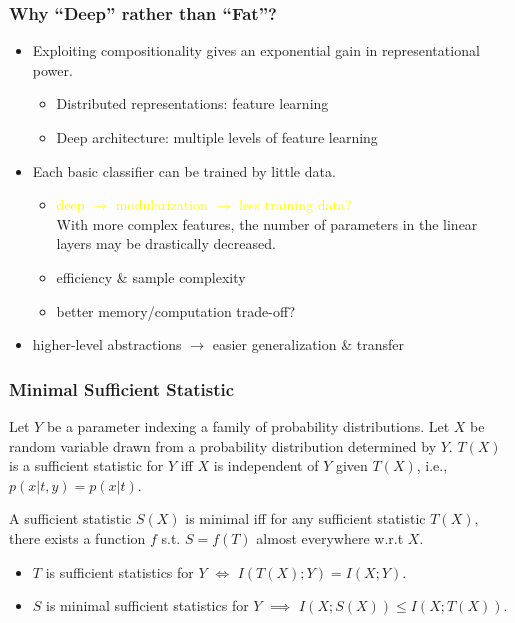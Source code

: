 \documentclass[UTF8,11pt,colorlinks,compress,openany]{beamer}%
\begin{document}
\begin{frame}\frametitle{Why ``Deep'' rather than ``Fat''?}	
	\begin{itemize}
		\item Exploiting compositionality gives an exponential gain in representational power.
		\begin{itemize}
			\item Distributed representations: feature learning
			\item Deep architecture: multiple levels of feature learning
		\end{itemize}
		\item Each basic classifier can be trained by little data.
		\begin{itemize}
			\item \textcolor{yellow}{deep $\to$ modularization $\to$ less training data?}\\
			With more complex features, the number of parameters in the linear layers may be drastically decreased.
			\item efficiency \& sample complexity
			\item better memory/computation trade-off?
		\end{itemize}
		\item higher-level abstractions $\to$ easier generalization \& transfer
	\end{itemize}
\end{frame}

\begin{frame}\frametitle{Minimal Sufficient Statistic}
\begin{definition}
Let $Y$ be a parameter indexing a family of probability distributions. Let $X$ be random variable drawn from a probability distribution determined by $Y$. $T(X)$ is a sufficient statistic for $Y$ iff $X$ is independent of $Y$ given $T(X)$, i.e., $p(x|t,y)=p(x|t)$.
\end{definition}
\begin{definition}
A sufficient statistic $S(X)$ is minimal iff for any sufficient statistic $T(X)$, there exists a function $f$ s.t. $S=f(T)$ almost everywhere w.r.t $X$.
\end{definition}
\begin{theorem}
\begin{itemize}
\item $T$ is sufficient statistics for $Y$ $\iff$ $I(T(X);Y)=I(X;Y)$.
\item $S$ is minimal sufficient statistics for $Y$ $\implies$ $I(X;S(X))\leq I(X;T(X))$.
\end{itemize}
\end{theorem}
\end{frame}
\end{document}
